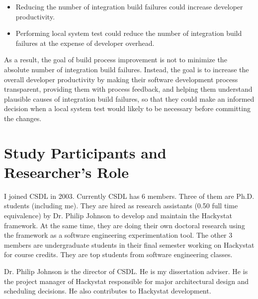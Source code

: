 \begin{itemize}
	\item Reducing the number of integration build failures could increase developer productivity.
	\item Performing local system test could reduce the number of integration build failures at the expense of developer overhead. 
\end{itemize}

As a result, the goal of build process improvement is not to minimize the absolute number of integration build failures. Instead, the goal is to increase the overall developer productivity by making their software development process transparent, providing them with process feedback, and helping them understand plausible causes of integration build failures, so that they could make an informed decision when a local system test would likely to be necessary before committing the changes. 







\section{Study Participants and Researcher's Role}  \label{EvaluationInCSDL:Role}

I joined CSDL in 2003. Currently CSDL has 6 members. Three of them are Ph.D. students (including me). They are hired as research assistants (0.50 full time equivalence) by Dr. Philip Johnson to develop and maintain the Hackystat framework. At the same time, they are doing their own doctoral research using the framework as a software engineering experimentation tool. The other 3 members are undergraduate students in their final semester working on Hackystat for course credits. They are top students from software engineering classes.

Dr. Philip Johnson is the director of CSDL. He is my dissertation adviser. He is the project manager of Hackystat responsible for major architectural design and scheduling decisions. He also contributes to Hackystat development.

